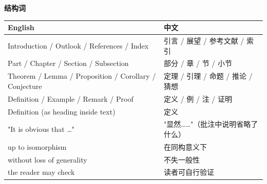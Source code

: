 \vspace{0.6em}
\noindent\textbf{结构词}\par\nobreak
\vspace{0.3em}
{\small
\begin{longtable}{p{}p{}}
\toprule
English & 中文 \\
\midrule
\endhead
Introduction / Outlook / References / Index & 引言 / 展望 / 参考文献 / 索引 \\
Part / Chapter / Section / Subsection & 部分 / 章 / 节 / 小节 \\
Theorem / Lemma / Proposition / Corollary / Conjecture & 定理 / 引理 / 命题 / 推论 / 猜想 \\
Definition / Example / Remark / Proof & 定义 / 例 / 注 / 证明 \\
Definition (as heading inside text) & 定义 \\
"It is obvious that …" & "显然……"（批注中说明省略了什么） \\
up to isomorphism & 在同构意义下 \\
without loss of generality & 不失一般性 \\
the reader may check & 读者可自行验证 \\
\bottomrule
\end{longtable}}
